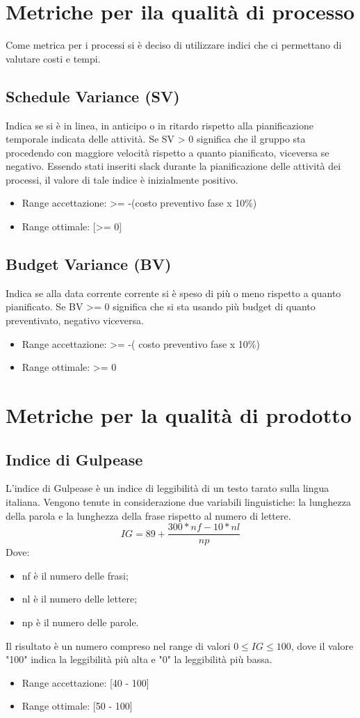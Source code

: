 \section{Metriche per ila qualità di processo}
Come metrica per i processi si è deciso di utilizzare indici che ci permettano di valutare costi e tempi. 
\subsection{Schedule Variance (SV)}
Indica se si è in linea, in anticipo o in ritardo rispetto alla pianificazione temporale indicata delle attività. 
Se SV > 0 significa che il gruppo sta procedendo con maggiore velocità rispetto a quanto pianificato, viceversa se negativo. 
Essendo stati inseriti slack durante la pianificazione delle attività dei processi, il valore di tale indice è inizialmente positivo.
\begin{itemize}
	\item Range accettazione: >= -(costo preventivo fase x 10\%)
	\item Range ottimale: [>= 0] 
\end{itemize}
\subsection{Budget Variance (BV)}
Indica se alla data corrente corrente si è speso di più o meno rispetto a quanto pianificato.
Se BV >= 0 significa che si sta usando più budget di quanto preventivato, negativo viceversa.
\begin{itemize}
	\item  Range accettazione: >= -( costo preventivo fase x 10\%)
	\item Range ottimale: >= 0
\end{itemize}
\section{Metriche per la qualità di prodotto}
\subsection{Indice di Gulpease}
 L'indice di Gulpease è un indice di leggibilità di un testo tarato sulla lingua italiana. Vengono tenute in considerazione due variabili linguistiche:  la lunghezza della parola e la lunghezza della frase rispetto al numero di lettere.
\[ IG = 89+ \frac{300*nf - 10*nl}{np} \]
Dove:
\begin{itemize}
	\item nf è il numero delle frasi;
	\item nl è il numero delle lettere;
	\item np è il numero delle parole.
\end{itemize}
Il risultato è un numero compreso nel range di valori $0 \le{IG} \le{100}$, dove il valore "100" indica la leggibilità più alta e "0" la leggibilità più bassa.
\begin{itemize}
	\item Range accettazione: [40 - 100]
	\item Range ottimale: [50 - 100]
\end{itemize}
